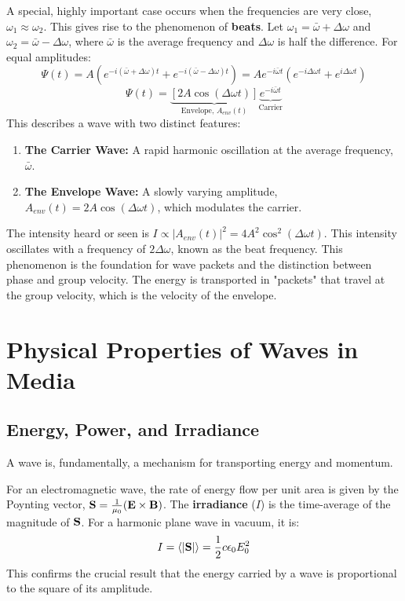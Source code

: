 \begin{definition}
\begin{proposition}
A special, highly important case occurs when the frequencies are very close, $\omega_1 \approx \omega_2$. This gives rise to the phenomenon of \textbf{beats}. Let $\omega_1 = \bar{\omega} + \Delta\omega$ and $\omega_2 = \bar{\omega} - \Delta\omega$, where $\bar{\omega}$ is the average frequency and $\Delta\omega$ is half the difference. For equal amplitudes:
$$ \Psi(t) = A(e^{-i(\bar{\omega}+\Delta\omega)t} + e^{-i(\bar{\omega}-\Delta\omega)t}) = A e^{-i\bar{\omega}t}(e^{-i\Delta\omega t} + e^{i\Delta\omega t}) $$
$$ \Psi(t) = \underbrace{[2A \cos(\Delta\omega t)]}_{\text{Envelope, } A_{env}(t)} \underbrace{e^{-i\bar{\omega}t}}_{\text{Carrier}} $$
This describes a wave with two distinct features:
\begin{enumerate}
    \item \textbf{The Carrier Wave:} A rapid harmonic oscillation at the average frequency, $\bar{\omega}$.
    \item \textbf{The Envelope Wave:} A slowly varying amplitude, $A_{env}(t) = 2A\cos(\Delta\omega t)$, which modulates the carrier.
\end{enumerate}
The intensity heard or seen is $I \propto |A_{env}(t)|^2 = 4A^2\cos^2(\Delta\omega t)$. This intensity oscillates with a frequency of $2\Delta\omega$, known as the beat frequency. This phenomenon is the foundation for wave packets and the distinction between phase and group velocity. The energy is transported in "packets" that travel at the group velocity, which is the velocity of the envelope.
\end{proposition}

\section{Physical Properties of Waves in Media}

\subsection{Energy, Power, and Irradiance}
A wave is, fundamentally, a mechanism for transporting energy and momentum.
\begin{definition}[Irradiance]
For an electromagnetic wave, the rate of energy flow per unit area is given by the Poynting vector, $\mathbf{S} = \frac{1}{\mu_0}(\mathbf{E} \times \mathbf{B})$. The \textbf{irradiance} ($I$) is the time-average of the magnitude of $\mathbf{S}$. For a harmonic plane wave in vacuum, it is:
$$ I = \langle |\mathbf{S}| \rangle = \frac{1}{2}c\epsilon_0 E_0^2 $$
This confirms the crucial result that the energy carried by a wave is proportional to the square of its amplitude.
\end{definition}


\end{definition}

